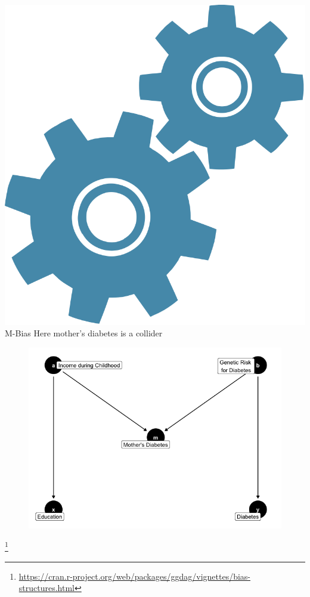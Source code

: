 \documentclass[10pt,t]{beamer}
\begin{document}
\begin{frame}{\includegraphics[scale = 0.015]{figures/technical}M-Bias}
	Here mother's diabetes is a collider
	\begin{figure}
	\includegraphics[scale = 0.4]{figures/m_bias}	
		\end{figure}
\footnote{\url{https://cran.r-project.org/web/packages/ggdag/vignettes/bias-structures.html}}
\end{frame}
\end{document}

